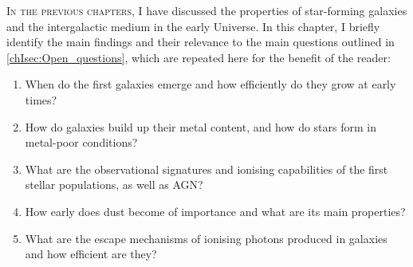     \BgThispage
    
    \fancyhf{}
    \fancyfoot[C]{\color{white}\thepage}
    \newpage
    \setFancyHdr
\fi

\lettrine{I}{n the previous chapters}, I have discussed the properties of star-forming galaxies and the intergalactic medium in the early Universe. In this chapter, I briefly identify the main findings and their relevance to the main questions outlined in \cref{chIsec:Open_questions}, which are repeated here for the benefit of the reader:
\begin{enumerate}[label=(\roman*)]
    \item When do the first galaxies emerge and how efficiently do they grow at early times?
    \item How do galaxies build up their metal content, and how do stars form in metal-poor conditions?
    \item What are the observational signatures and ionising capabilities of the first stellar populations, as well as AGN?
    \item How early does dust become of importance and what are its main properties?
    \item What are the escape mechanisms of ionising photons produced in galaxies and how efficient are they?
\end{enumerate}

